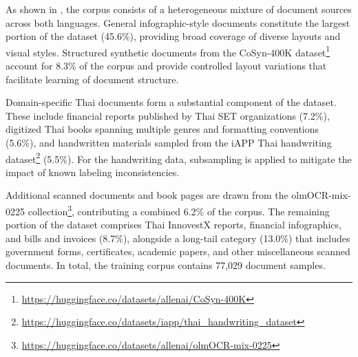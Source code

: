 \documentclass[]{typhoon} %
\begin{document}

As shown in , the corpus consists of a heterogeneous mixture of document sources across both languages. General infographic-style documents constitute the largest portion of the dataset (45.6\%), providing broad coverage of diverse layouts and visual styles. Structured synthetic documents from the CoSyn-400K dataset\footnote{\url{https://huggingface.co/datasets/allenai/CoSyn-400K}} \citep{yang2025scaling} account for 8.3\% of the corpus and provide controlled layout variations that facilitate learning of document structure.

Domain-specific Thai documents form a substantial component of the dataset. These include financial reports published by Thai SET organizations (7.2\%), digitized Thai books spanning multiple genres and formatting conventions (5.6\%), and handwritten materials sampled from the iAPP Thai handwriting dataset\footnote{\url{https://huggingface.co/datasets/iapp/thai_handwriting_dataset}} (5.5\%). For the handwriting data, subsampling is applied to mitigate the impact of known labeling inconsistencies.

Additional scanned documents and book pages are drawn from the olmOCR-mix-0225 collection\footnote{\url{https://huggingface.co/datasets/allenai/olmOCR-mix-0225}}, contributing a combined 6.2\% of the corpus. The remaining portion of the dataset comprises Thai InnovestX reports, financial infographics, and bills and invoices (8.7\%), alongside a long-tail category (13.0\%) that includes government forms, certificates, academic papers, and other miscellaneous scanned documents. In total, the training corpus contains 77,029 document samples.




\end{document}
